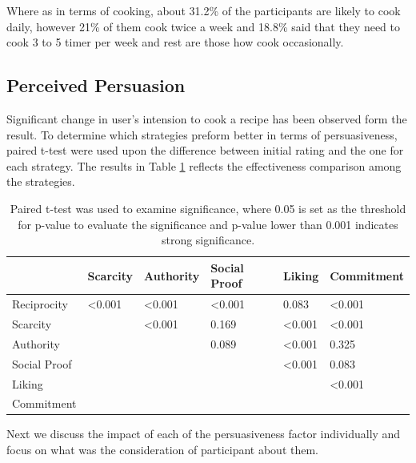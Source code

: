 Where as in terms of cooking, about 31.2\% of the participants are likely to cook daily, however 21\% of them cook twice a week and 18.8\% said that they need to cook 3 to 5 timer per week and rest are those how cook occasionally.

\subsection{Perceived Persuasion}

Significant change in user’s intension to cook a recipe has been observed form the result. To determine which strategies preform better in terms of persuasiveness, paired t-test were used upon the difference between initial rating and the one for each strategy. The results in Table \ref{table:persusasion-result} reflects the effectiveness comparison among the strategies. 

\begin{table}[ht]
	\centering %
	\begin{tabular}{p{2cm} p{2cm} p{2cm} p{2cm} p{2cm} p{2cm}}
		\hline\hline %
		& Scarcity & Authority & Social Proof & Liking & Commitment\\ %
		\hline %
		Reciprocity   & <0.001  & <0.001 & <0.001 &  0.083 & <0.001 \\ %
		Scarcity      &         & <0.001 &  0.169 & <0.001 & <0.001 \\
		Authority     &         &        &  0.089 & <0.001 &  0.325 \\
		Social Proof  &         &        &        & <0.001 &  0.083 \\
		Liking        &         &        &        &        & <0.001 \\
		Commitment    &         &        &        &        &  \\ [1ex] %
		\hline %
	\end{tabular}
	\caption{Paired t-test was used to examine significance, where 0.05 is set as the threshold for p-value to evaluate the significance and p-value lower than 0.001 indicates strong significance.}
	\label{table:persusasion-result}
\end{table}


Next we discuss the impact of each of the persuasiveness factor individually and focus on what was the consideration of participant about them.\newline

